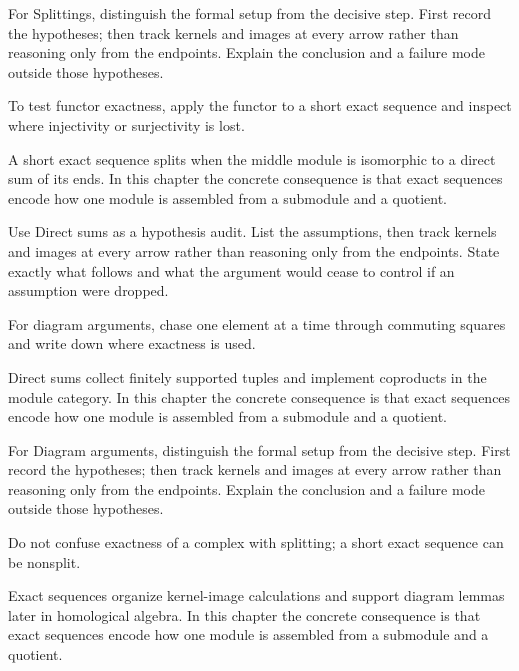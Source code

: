 \begin{exercise}\label{exr:v09-06}
For Splittings, distinguish the formal setup from the decisive step. First record the hypotheses; then track kernels and images at every arrow rather than reasoning only from the endpoints. Explain the conclusion and a failure mode outside those hypotheses.
\end{exercise}
\begin{hint}
To test functor exactness, apply the functor to a short exact sequence and inspect where injectivity or surjectivity is lost.
\end{hint}
\begin{solution}
A short exact sequence splits when the middle module is isomorphic to a direct sum of its ends. In this chapter the concrete consequence is that exact sequences encode how one module is assembled from a submodule and a quotient.
\end{solution}

\begin{exercise}\label{exr:v09-07}
Use Direct sums as a hypothesis audit. List the assumptions, then track kernels and images at every arrow rather than reasoning only from the endpoints. State exactly what follows and what the argument would cease to control if an assumption were dropped.
\end{exercise}
\begin{hint}
For diagram arguments, chase one element at a time through commuting squares and write down where exactness is used.
\end{hint}
\begin{solution}
Direct sums collect finitely supported tuples and implement coproducts in the module category. In this chapter the concrete consequence is that exact sequences encode how one module is assembled from a submodule and a quotient.
\end{solution}

\begin{exercise}\label{exr:v09-08}
For Diagram arguments, distinguish the formal setup from the decisive step. First record the hypotheses; then track kernels and images at every arrow rather than reasoning only from the endpoints. Explain the conclusion and a failure mode outside those hypotheses.
\end{exercise}
\begin{hint}
Do not confuse exactness of a complex with splitting; a short exact sequence can be nonsplit.
\end{hint}
\begin{solution}
Exact sequences organize kernel-image calculations and support diagram lemmas later in homological algebra. In this chapter the concrete consequence is that exact sequences encode how one module is assembled from a submodule and a quotient.
\end{solution}

